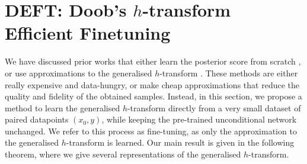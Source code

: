 \section{DEFT: Doob's \texorpdfstring{$h$}{h}-transform Efficient Finetuning}
\label{sec:training_objectives}

We have discussed prior works that either learn the posterior score from scratch \citep{batzolis2021conditional,ho2022classifier}, or use approximations to the generalised $h$-transform \citep{chung2022diffusion,kawar2022denoising}. These methods are either really expensive and data-hungry, or make cheap approximations that reduce the quality and fidelity of the obtained samples. Instead, in this section, we propose a method to learn the generalised $h$-transform directly from a very small dataset of paired datapoints $(x_0, y)$, while keeping the pre-trained unconditional network unchanged. We refer to this process as fine-tuning, as only the approximation to the generalised $h$-transform is learned. Our main result is given in the following theorem, where we give several representations of the generalised $h$-transform. 

